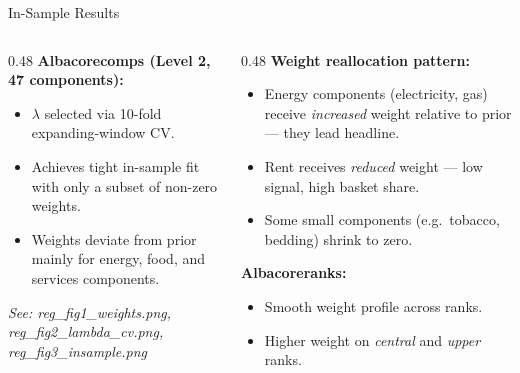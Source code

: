 \documentclass[aspectratio=169, 11pt]{beamer}
\begin{document}
\begin{frame}{In-Sample Results}
  \begin{columns}[T]
    \begin{column}{0.48\textwidth}
      \textbf{Albacorecomps (Level 2, 47 components):}
      \begin{itemize}
        \item $\lambda$ selected via 10-fold expanding-window CV.
        \item Achieves tight in-sample fit with only a subset of non-zero weights.
        \item Weights deviate from prior mainly for
              \alert{energy}, \alert{food}, and \alert{services} components.
      \end{itemize}
      \vfill
      \textit{See: reg\_fig1\_weights.png, reg\_fig2\_lambda\_cv.png, reg\_fig3\_insample.png}
    \end{column}
    \begin{column}{0.48\textwidth}
      \textbf{Weight reallocation pattern:}
      \begin{itemize}
        \item Energy components (electricity, gas) receive
              \emph{increased} weight relative to prior --- they lead headline.
        \item Rent receives \emph{reduced} weight --- low signal, high basket share.
        \item Some small components (e.g.\ tobacco, bedding) shrink to zero.
      \end{itemize}
      \vspace{6pt}
      \textbf{Albacoreranks:}
      \begin{itemize}
        \item Smooth weight profile across ranks.
        \item Higher weight on \emph{central} and \emph{upper} ranks.
      \end{itemize}
    \end{column}
  \end{columns}
\end{frame}
\end{document}
